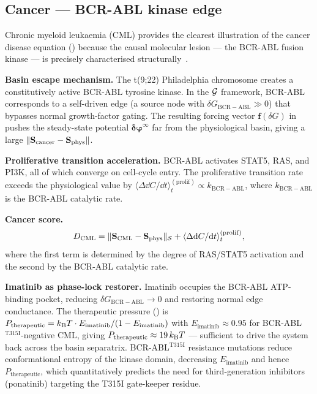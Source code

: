 \subsection{Cancer — BCR-ABL kinase edge}
\label{sec:ch07-eg-cancer}

\begin{example}
\label{ex:ch07-cml}
Chronic myeloid leukaemia (CML) provides the clearest illustration of the
cancer disease equation () because the causal
molecular lesion — the BCR-ABL fusion kinase — is precisely characterised
structurally~\citep{jumper2021}.

\textbf{Basin escape mechanism.}  The t(9;22) Philadelphia chromosome creates
a constitutively active BCR-ABL tyrosine kinase.  In the $\mathcal{G}$ framework,
BCR-ABL corresponds to a self-driven edge (a source node with
$\delta G_{\mathrm{BCR-ABL}} \gg 0$) that bypasses normal growth-factor
gating.  The resulting forcing vector $\mathbf{f}(\delta G)$ in
 pushes the steady-state potential
$\boldsymbol{\delta\varphi}^{\infty}$ far from the physiological basin,
giving a large $\|\mathbf{S}_{\mathrm{cancer}} - \mathbf{S}_{\mathrm{phys}}\|$.

\textbf{Proliferative transition acceleration.}  BCR-ABL activates STAT5,
RAS, and PI3K, all of which converge on cell-cycle entry.  The proliferative
transition rate exceeds the physiological value by
$\langle\Delta\dd C/\dd t\rangle_t^{(\mathrm{prolif})} \propto
k_{\mathrm{BCR-ABL}}$, where $k_{\mathrm{BCR-ABL}}$ is the BCR-ABL
catalytic rate.

\textbf{Cancer score.}
\begin{equation}
  D_{\mathrm{CML}}
  = \|\mathbf{S}_{\mathrm{CML}} - \mathbf{S}_{\mathrm{phys}}\|_{\mathcal{S}}
    + \langle\Delta\dd C/\dd t\rangle_t^{(\mathrm{prolif})},
  \label{eq:ch07-CML-score}
\end{equation}
where the first term is determined by the degree of RAS/STAT5 activation and
the second by the BCR-ABL catalytic rate.

\textbf{Imatinib as phase-lock restorer.}  Imatinib occupies the BCR-ABL
ATP-binding pocket, reducing $\delta G_{\mathrm{BCR-ABL}} \to 0$ and
restoring normal edge conductance.  The therapeutic pressure
() is
$P_{\mathrm{therapeutic}} = k_{\mathrm{B}} T \cdot E_{\mathrm{imatinib}}/(1 - E_{\mathrm{imatinib}})$
with $E_{\mathrm{imatinib}} \approx 0.95$ for BCR-ABL$^{\mathrm{T315I}}$-negative
CML, giving $P_{\mathrm{therapeutic}} \approx 19\,k_{\mathrm{B}} T$ — sufficient to
drive the system back across the basin separatrix.  BCR-ABL$^{\mathrm{T315I}}$
resistance mutations reduce conformational entropy of the kinase domain,
decreasing $E_{\mathrm{imatinib}}$ and hence $P_{\mathrm{therapeutic}}$, which
quantitatively predicts the need for third-generation inhibitors (ponatinib)
targeting the T315I gate-keeper residue.


\end{example}
